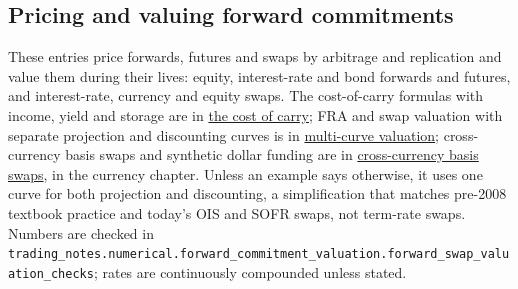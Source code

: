 \subsection{Pricing and valuing forward commitments}

These entries price forwards, futures and swaps by arbitrage and replication and value them during their lives: equity, interest-rate and bond forwards and futures, and interest-rate, currency and equity swaps. The cost-of-carry formulas with income, yield and storage are in \hyperref[res:cost-of-carry-forward-price]{the cost of carry}; FRA and swap valuation with separate projection and discounting curves is in \hyperref[mod:multi-curve-fra-swap-valuation]{multi-curve valuation}; cross-currency basis swaps and synthetic dollar funding are in \hyperref[meth:cross-currency-basis-swaps]{cross-currency basis swaps}, in the currency chapter. Unless an example says otherwise, it uses one curve for both projection and discounting, a simplification that matches pre-2008 textbook practice and today's OIS and SOFR swaps, not term-rate swaps. Numbers are checked in \nolinkurl{trading_notes.numerical.forward_commitment_valuation.forward_swap_valuation_checks}; rates are continuously compounded unless stated.

